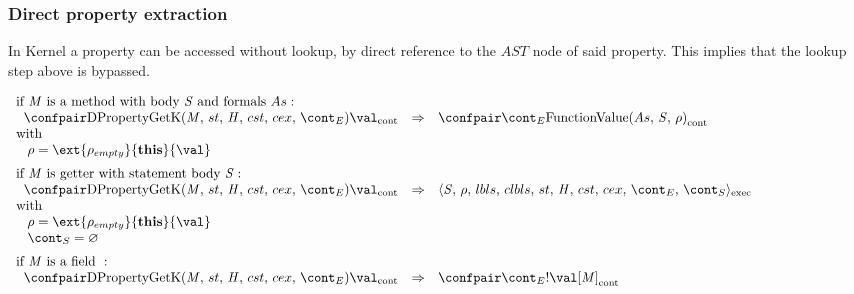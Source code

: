\documentclass{article}
\renewcommand{\emptyset}{\varnothing}
\begin{document}
\subsubsection{Direct property extraction}
\label{subsubsec:direct-property-extraction}
In Kernel a property can be accessed without lookup, by direct reference to the $AST$ node of said property.
This implies that the lookup step above is bypassed.

\[
  \begin{array}{lcl@{\hspace{30mm}}}
	\textrm{if }\membermeta \textrm{ is a method with body }\stmt\textrm{ and formals }\formals :\\
	\hspace{2mm}
	\cesktrans{
		\contconf{\DPropertyGetK}{\val}}{
		\contconf{\econt}{\funval{\formals}{\stmt}{\env}}}\\
	\textrm{with}\\
	\hspace{3mm}
	\env = \ext{\env_{empty}}{\mathbf{this}}{\val}\\[2mm]

	\textrm{if }\membermeta \textrm{ is getter with statement body }\stmt :\\
	\hspace{2mm}
	\cesktrans{
		\contconf{\DPropertyGetK}{\val}}{
		\execconf{\stmt}{\env}{\lbls}{\clbls}{\handler}{\cstrace}{\cex}{\econt}{\scont}}
		\\
	\textrm{with}\\
	\hspace{3mm}
	\env = \ext{\env_{empty}}{\mathbf{this}}{\val}\\
	\hspace{3mm}
	\scont = \emptyset\\[2mm]

	\textrm{if }\membermeta \textrm{ is a field } :\\
	\hspace{2mm}\cesktrans{
		\contconf{\DPropertyGetK}{\val}}{
		\contconf{\econt}{\deref{\val[\membermeta]}}}\\
  \end{array}
\]
\end{document}
